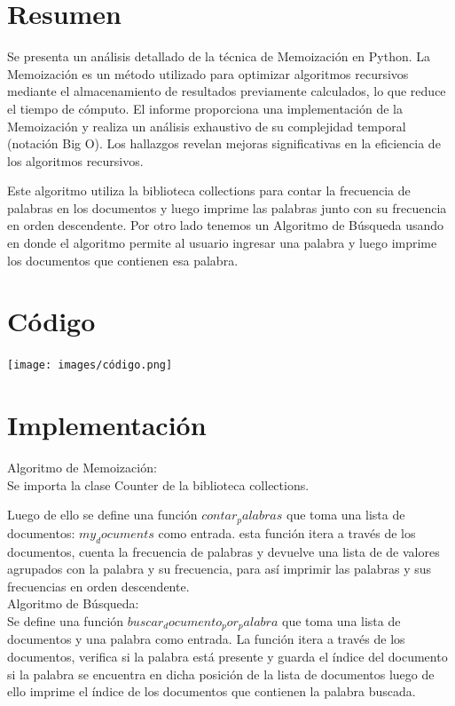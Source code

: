 \documentclass[a4paper,twocolumn,10pt]{article}
\begin{document}
\section{Resumen}

Se presenta un análisis detallado de la técnica de Memoización en Python. La Memoización es un método utilizado para optimizar algoritmos recursivos mediante el almacenamiento de resultados previamente calculados, lo que reduce el tiempo de cómputo. El informe proporciona una implementación de la Memoización y realiza un análisis exhaustivo de su complejidad temporal (notación Big O). Los hallazgos revelan mejoras significativas en la eficiencia de los algoritmos recursivos.

Este algoritmo utiliza la biblioteca collections para contar la frecuencia de palabras en los documentos y luego imprime las palabras junto con su frecuencia en orden descendente.
Por otro lado tenemos un Algoritmo de Búsqueda usando en donde el algoritmo permite al usuario ingresar una palabra y luego imprime los documentos que contienen esa palabra.

\section{Código}

\texttt{[image: images/código.png]}\\

\section{Implementación}

Algoritmo de Memoización:\\

Se importa la clase Counter de la biblioteca collections.

Luego de ello se define una función $contar_palabras$ que toma una lista de documentos: $my_documents$ como entrada.
esta función itera a través de los documentos, cuenta la frecuencia de palabras y devuelve una lista de de valores agrupados con la palabra y su frecuencia, para así imprimir las palabras y sus frecuencias en orden descendente.\\

Algoritmo de Búsqueda:\\
Se define una función $buscar_documento_por_palabra$ que toma una lista de documentos y una palabra como entrada.
La función itera a través de los documentos, verifica si la palabra está presente y guarda el índice del documento si la palabra se encuentra en dicha posición de la lista de documentos luego de ello imprime el índice de los documentos que contienen la palabra buscada.
\end{document}
